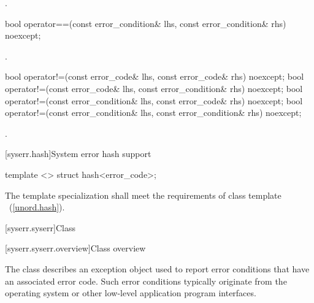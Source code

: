 \begin{itemdescr}
\pnum
\returns {}.
\end{itemdescr}

%
%
\begin{itemdecl}
bool operator==(const error_condition& lhs, const error_condition& rhs) noexcept;
\end{itemdecl}

\begin{itemdescr}
\pnum
\returns {}.
\end{itemdescr}

%
%
%
%
\begin{itemdecl}
bool operator!=(const error_code& lhs, const error_code& rhs) noexcept;
bool operator!=(const error_code& lhs, const error_condition& rhs) noexcept;
bool operator!=(const error_condition& lhs, const error_code& rhs) noexcept;
bool operator!=(const error_condition& lhs, const error_condition& rhs) noexcept;
\end{itemdecl}

\begin{itemdescr}
\pnum
\returns {}.
\end{itemdescr}

[syserr.hash]{System error hash support}

%
\begin{itemdecl}
template <> struct hash<error_code>;
\end{itemdecl}

\begin{itemdescr}
\pnum The template specialization shall meet the requirements of class template
~(\ref{unord.hash}).
\end{itemdescr}

[syserr.syserr]{Class }

[syserr.syserr.overview]{Class  overview}

\pnum
The class  describes an exception object used to
report error conditions that have an associated error code. Such error
conditions typically originate from the operating system or other low-level
application program interfaces.


